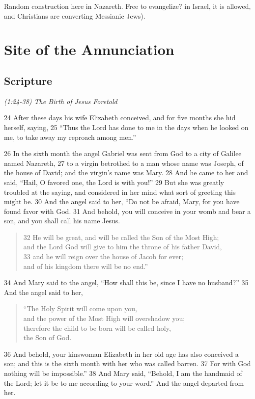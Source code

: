 \documentclass[letterpaper]{report}
\begin{document}
Random construction here in Nazareth.  Free to evangelize? in Israel, it is allowed, and Christians are converting Messianic Jews).


\clearpage
\section{Site of the Annunciation}
\begin{multicols}{2}
	\mbox{}
\end{multicols}
\subsection{Scripture}

{\centering
	\emph{(1:24-38) The Birth of Jesus Foretold}\\
}
\begin{multicols}{2}
24 After these days his wife Elizabeth conceived, and for five months she hid herself, saying, 25 “Thus the Lord has done to me in the days when he looked on me, to take away my reproach among men.”

26 In the sixth month the angel Gabriel was sent from God to a city of Galilee named Nazareth, 27 to a virgin betrothed to a man whose name was Joseph, of the house of David; and the virgin’s name was Mary. 28 And he came to her and said, “Hail, O favored one, the Lord is with you!” 29 But she was greatly troubled at the saying, and considered in her mind what sort of greeting this might be. 30 And the angel said to her, “Do not be afraid, Mary, for you have found favor with God. 31 And behold, you will conceive in your womb and bear a son, and you shall call his name Jesus.

\begin{verse}
32 He will be great, and will be called the Son of the Most High;\\
and the Lord God will give to him the throne of his father David,\\
33 and he will reign over the house of Jacob for ever;\\
and of his kingdom there will be no end.”\\
\end{verse}

34 And Mary said to the angel, “How shall this be, since I have no husband?” 35 And the angel said to her,

\begin{verse}
“The Holy Spirit will come upon you,\\
and the power of the Most High will overshadow you;\\
therefore the child to be born will be called holy,\\
the Son of God.\\
\end{verse}
36 And behold, your kinswoman Elizabeth in her old age has also conceived a son; and this is the sixth month with her who was called barren. 37 For with God nothing will be impossible.” 38 And Mary said, “Behold, I am the handmaid of the Lord; let it be to me according to your word.” And the angel departed from her.

\end{multicols}
\end{document}
